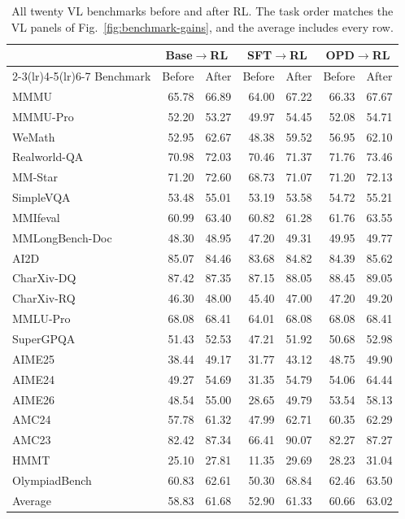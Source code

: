 \documentclass[]{jingdong}
\theoremstyle{plain}
\theoremstyle{definition}
\theoremstyle{remark}
\newcommand{\opdrl}{OPD$\rightarrow$RL}
\newcommand{\baserl}{Base$\rightarrow$RL}
\newcommand{\sftrl}{SFT$\rightarrow$RL}
\begin{document}
\begin{table}[H]
\centering
\small
\setlength{\tabcolsep}{3pt}
\renewcommand{\arraystretch}{1.05}
\caption{All twenty VL benchmarks before and after RL. The task order matches the VL panels of Fig.~\ref{fig:benchmark-gains}, and the average includes every row.}
\label{tab:appendix-vl-results}
\begin{tabular*}{\linewidth}{@{\extracolsep{\fill}}lrrrrrr@{}}
\toprule
& \multicolumn{2}{c}{\baserl{}} & \multicolumn{2}{c}{\sftrl{}} & \multicolumn{2}{c}{\opdrl{}} \\
\cmidrule(lr){2-3}\cmidrule(lr){4-5}\cmidrule(lr){6-7}
Benchmark & Before & After & Before & After & Before & After \\
\midrule
MMMU              & 65.78 & 66.89 & 64.00 & 67.22 & 66.33 & 67.67 \\
MMMU-Pro          & 52.20 & 53.27 & 49.97 & 54.45 & 52.08 & 54.71 \\
WeMath            & 52.95 & 62.67 & 48.38 & 59.52 & 56.95 & 62.10 \\
Realworld-QA      & 70.98 & 72.03 & 70.46 & 71.37 & 71.76 & 73.46 \\
MM-Star           & 71.20 & 72.60 & 68.73 & 71.07 & 71.20 & 72.13 \\
SimpleVQA         & 53.48 & 55.01 & 53.19 & 53.58 & 54.72 & 55.21 \\
MMIfeval          & 60.99 & 63.40 & 60.82 & 61.28 & 61.76 & 63.55 \\
MMLongBench-Doc   & 48.30 & 48.95 & 47.20 & 49.31 & 49.95 & 49.77 \\
AI2D              & 85.07 & 84.46 & 83.68 & 84.82 & 84.39 & 85.62 \\
CharXiv-DQ        & 87.42 & 87.35 & 87.15 & 88.05 & 88.45 & 89.05 \\
CharXiv-RQ        & 46.30 & 48.00 & 45.40 & 47.00 & 47.20 & 49.20 \\
MMLU-Pro          & 68.08 & 68.41 & 64.01 & 68.08 & 68.08 & 68.41 \\
SuperGPQA         & 51.43 & 52.53 & 47.21 & 51.92 & 50.68 & 52.98 \\
AIME25            & 38.44 & 49.17 & 31.77 & 43.12 & 48.75 & 49.90 \\
AIME24            & 49.27 & 54.69 & 31.35 & 54.79 & 54.06 & 64.44 \\
AIME26            & 48.54 & 55.00 & 28.65 & 49.79 & 53.54 & 58.13 \\
AMC24             & 57.78 & 61.32 & 47.99 & 62.71 & 60.35 & 62.29 \\
AMC23             & 82.42 & 87.34 & 66.41 & 90.07 & 82.27 & 87.27 \\
HMMT              & 25.10 & 27.81 & 11.35 & 29.69 & 28.23 & 31.04 \\
OlympiadBench     & 60.83 & 62.61 & 50.30 & 68.84 & 62.46 & 63.50 \\
\midrule
Average  & 58.83 & 61.68 & 52.90 & 61.33 & 60.66 & 63.02 \\
\bottomrule
\end{tabular*}
\end{table}
\end{document}

